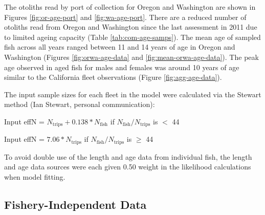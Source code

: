 \documentclass[11pt,
  english,
  a4paper,
]{article}
\begin{document}

The otoliths read by port of collection for Oregon and Washington are shown in Figures \ref{fig:or-age-port} and \ref{fig:wa-age-port}. There are a reduced number of otoliths read from Oregon and Washington since the last assessment in 2011 due to limited ageing capacity (Table \ref{tab:com-age-samps}). The mean age of sampled fish across all years ranged between 11 and 14 years of age in Oregon and Washington (Figures \ref{fig:orwa-age-data} and \ref{fig:mean-orwa-age-data}). The peak age observed in aged fish for males and females was around 10 years of age similar to the California fleet observations (Figure \ref{fig:agg-age-data}).

\leavevmode\tagmcend\tagstructend\par


The input sample sizes for each fleet in the model were calculated via the Stewart method (Ian Stewart, personal communication):

\leavevmode\tagmcend\tagstructend\par

\begin{centering}

Input effN = $N_{\text{trips}} + 0.138 * N_{\text{fish}}$ if $N_{\text{fish}}/N_{\text{trips}}$ is $<$ 44

Input effN = $7.06 * N_{\text{trips}}$ if $N_{\text{fish}}/N_{\text{trips}}$ is $\geq$ 44

\end{centering}

\vspace{0.50cm}


To avoid double use of the length and age data from individual fish, the length and age data sources were each given 0.50 weight in the likelihood calculations when model fitting.

\leavevmode\tagmcend\tagstructend\par


\hypertarget{fishery-independent-data}{%
\subsection{Fishery-Independent Data}\label{fishery-independent-data}}
\end{document}
